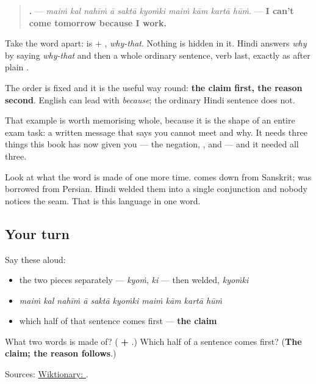 \begin{grammarlens}[title={Grammar Lens: \hi{क्यों} + \hi{कि}}]
\begin{quote}
\textbf{         .} — \emph{maiṁ kal nahīṁ ā saktā kyoṁki maiṁ kām kartā hūṁ.} — \textbf{I can't come tomorrow because I work.}
\end{quote}

Take the word apart: \textbf{} is \textbf{} + \textbf{}, \emph{why-that}. Nothing is hidden in it. Hindi answers \emph{why} by saying \emph{why-that} and then a whole ordinary sentence, verb last, exactly as after plain \textbf{}.

The order is fixed and it is the useful way round: \textbf{the claim first, the reason second}. English can lead with \emph{because}; the ordinary Hindi sentence does not.

That example is worth memorising whole, because it is the shape of an entire exam task: a written message that says you cannot meet and why. It needs three things this book has now given you — the negation, \textbf{}, and \textbf{} — and it needed all three.

Look at what the word is made of one more time. \textbf{} comes down from Sanskrit; \textbf{} was borrowed from Persian. Hindi welded them into a single conjunction and nobody notices the seam. That is this language in one word.
\end{grammarlens}

\subsection*{Your turn}
Say these aloud:

\begin{itemize}
\raggedright
  \item the two pieces separately — \emph{kyoṁ}, \emph{ki} — then welded, \emph{kyoṁki}
  \item \emph{maiṁ kal nahīṁ ā saktā kyoṁki maiṁ kām kartā hūṁ}
  \item which half of that sentence comes first — \textbf{the claim}
\end{itemize}

\begin{tcolorbox}[breakable,colback=teal!4,colframe=teal!35!black,title={Before you move on}]
What two words is \textbf{} made of? (\textbf{ + }.) Which half of a \textbf{} sentence comes first? (\textbf{The claim; the reason follows}.)

Sources: \href{https://en.wiktionary.org/wiki/\%E0\%A4\%95\%E0\%A5\%8D\%E0\%A4\%AF\%E0\%A5\%8B\%E0\%A4\%82\%E0\%A4\%95\%E0\%A4\%BF}{Wiktionary: }.
\end{tcolorbox}
